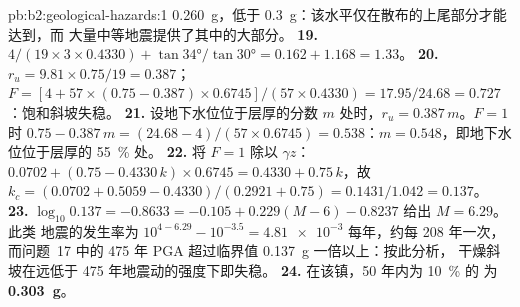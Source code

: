 \begin{solution}{pb:b2:geological-hazards:1}
\qty{0.260}{g}，低于 \qty{0.3}{g}：该水平仅在散布的上尾部分才能达到，而
大量中等地震提供了其中的大部分。
\textbf{19.} $4/(19 \times 3 \times 0.4330) + \tan\ang{34}/\tan\ang{30} = 0.162 + 1.168 = 1.33$。
\textbf{20.} $r_u = 9.81 \times 0.75/19 = 0.387$；$F = [4 + 57 \times (0.75 - 0.387) \times
0.6745]/(57 \times 0.4330) = 17.95/24.68 = 0.727$：饱和斜坡失稳。
\textbf{21.} 设地下水位位于层厚的分数 $m$ 处时，$r_u = 0.387\,m$。$F = 1$ 时
$0.75 - 0.387\,m = (24.68 - 4)/(57 \times 0.6745) = 0.538$：$m = 0.548$，即地下水位位于层厚的
\qty{55}{\percent} 处。
\textbf{22.} 将 $F = 1$ 除以 $\gamma z$：$0.0702 + (0.75 - 0.4330\,k) \times 0.6745 = 0.4330 +
0.75\,k$，故 $k_c = (0.0702 + 0.5059 - 0.4330)/(0.2921 + 0.75) = 0.1431/1.042 = 0.137$。
\textbf{23.} $\log_{10} 0.137 = -0.8633 = -0.105 + 0.229(M - 6) - 0.8237$ 给出 $M = 6.29$。此类
地震的发生率为 $10^{4 - 6.29} - 10^{-3.5} = \num{4.81e-3}$ 每年，约每 208 年一次，
而问题~17 中的 475 年 PGA 超过临界值 \qty{0.137}{g} 一倍以上：按此分析，
干燥斜坡在远低于 475 年地震动的强度下即失稳。
\textbf{24.} 在该镇，50 年内为 \qty{10}{\percent} 的
为 \textbf{\qty[text-series-to-math=true]{0.303}{g}}。
\end{solution}
